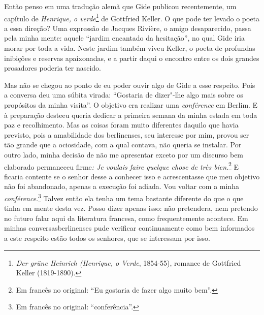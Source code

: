 Então penso em uma tradução alemã que Gide publicou recentemente, um
capítulo de \emph{Henrique, o verde}\footnote{\emph{Der grüne
  Heinrich (\emph{Henrique, o Verde}}, 1854-55), romance de Gottfried Keller
  (1819-1890). \versal{[N. E.]}} de Gottfried Keller. O que pode ter levado o poeta a
essa direção? Uma expressão de Jacques Rivière, o amigo desaparecido,
passa pela minha mente: aquele ``jardim encantado da hesitação'', no
qual Gide iria morar por toda a vida. Neste jardim também viveu Keller,
o poeta de profundas inibições e reservas apaixonadas, e a partir daqui
o encontro entre os dois grandes prosadores poderia ter nascido.

Mas não se chegou ao ponto de eu poder ouvir algo de Gide a esse
respeito. Pois a conversa deu uma súbita virada: ``Gostaria de dizer"-lhe
algo mais sobre os propósitos da minha visita''. O objetivo era realizar
uma \emph{conférence} em Berlim. E à preparação desteeu queria dedicar a
primeira semana da minha estada em toda paz e recolhimento. Mas as
coisas foram muito diferentes daquilo que havia previsto, pois a
amabilidade dos berlinenses, seu interesse por mim, provou ser tão
grande que a ociosidade, com a qual contava, não queria se instalar. Por
outro lado, minha decisão de não me apresentar exceto por um discurso
bem elaborado permaneceu firme\emph{: Je voulais faire quelque chose de
très bien}.\footnote{Em francês no original: ``Eu gostaria de fazer algo muito bem''. \versal{[N. T.]}}
E ficaria contente se o senhor desse a conhecer isso e acrescentasse que
meu objetivo não foi abandonado, apenas a execução foi adiada. Vou
voltar com a minha \emph{conférence}.\footnote{Em francês no original: ``conferência''. \versal{[N. T.]}}
Talvez então ela tenha um tema bastante diferente do que o que tinha em
mente desta vez. Posso dizer apenas isso: não pretendera, nem pretendo
no futuro falar aqui da literatura francesa, como frequentemente
acontece. Em minhas conversasberlinenses pude verificar continuamente
como bem informados a este respeito estão todos os senhores, que se
interessam por isso.

